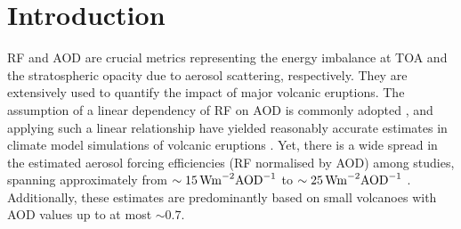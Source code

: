 \documentclass[draft]{agujournal2019}
\begin{document}
%
%


\section{Introduction}



RF and AOD are crucial metrics representing the energy imbalance at TOA and the
stratospheric opacity due to aerosol scattering, respectively. They are extensively used
to quantify the impact of major volcanic eruptions. The assumption of a linear
dependency of RF on AOD is commonly adopted \cite{myhre2013,andersson2015}, and applying
such a linear relationship have yielded reasonably accurate estimates in climate model
simulations of volcanic eruptions
\cite{mills2017,hansen2005,gregory2016,marshall2020,pitari2016b}. Yet, there is a wide
spread in the estimated aerosol forcing efficiencies (RF normalised by AOD) among
studies, spanning approximately from \(\sim \SI{15}{\watt\metre^{-2}\ce{AOD}^{-1}}\)
\cite{pitari2016b} to \(\sim \SI{25}{\watt\metre^{-2}\ce{AOD}^{-1}}\) \cite{myhre2013}.
Additionally, these estimates are predominantly based on small volcanoes with AOD values
up to at most \(\sim 0.7\).
\end{document}
